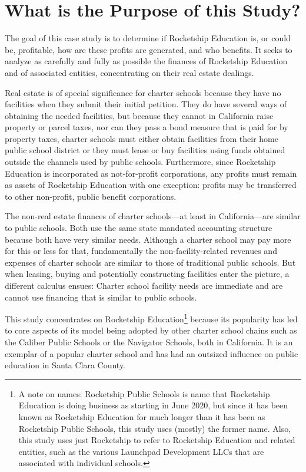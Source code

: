 \section{What is the Purpose of this Study?}\indent

The goal of this case study is to determine if Rocketship Education is, or could be, profitable, how are these profits are generated, and who benefits. It seeks to analyze as carefully and fully as possible the finances of Rocketship Education and of associated entities, concentrating on their real estate dealings.

Real estate is of special significance for charter schools because they have no facilities when they submit their initial petition. They do have several ways of obtaining the needed facilities, but because they cannot in California raise property or parcel taxes, nor can they pass a bond measure that is paid for by property taxes, charter schools must either obtain facilities from their home public school district or they must lease or buy facilities using funds obtained outside the channels used by public schools. Furthermore, since Rocketship Education is incorporated as not-for-profit corporations, any profits must remain as assets of Rocketship Education with one exception: profits may be transferred to other non-profit, public benefit corporations.

The non-real estate finances of charter schools—at least in California—are similar to public schools. Both use the same state mandated accounting structure because both have very similar needs. Although a charter school may pay more for this or less for that, fundamentally the non-facility-related revenues and expenses of charter schools are similar to those of traditional public schools. But when leasing, buying and potentially constructing facilities enter the picture, a different calculus ensues: Charter school facility needs are immediate and are cannot use financing that is similar to public schools.

This study concentrates on Rocketship Education\footnote{A note on names: Rocketship Public Schools is name that Rocketship Education is doing business as starting in June 2020, but since it has been known as Rocketship Education for much longer than it has been as Rocketship Public Schools, this study uses (mostly) the former name. Also, this study uses just Rocketship to refer to Rocketship Education and related entities, such as the various Launchpad Development LLCs that are associated with individual schools.} because its popularity has led to core aspects of its model being adopted by other charter school chains such as the Caliber Public Schools or the  Navigator Schools, both in California.  It is an exemplar of a popular charter school and has had an outsized influence on public education in Santa Clara County.

